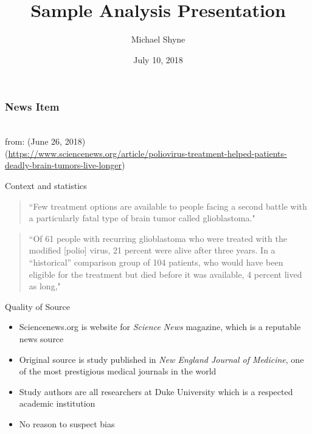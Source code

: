\documentclass[xcolor=table, aspectratio=169, bigger]{beamer}
\title[Short title]{Sample Analysis Presentation}
\author[M. Shyne]{\Large Michael Shyne}
\date{July 10, 2018}
\begin{document}
\frame{\titlepage}

\begin{frame}
\frametitle{News Item}
{\centering 
{}\\
\medskip
from:  (June 26, 2018)\\
\smallskip
(\href{https://www.sciencenews.org/article/poliovirus-treatment-helped-patients-deadly-brain-tumors-live-longer}{https://www.sciencenews.org/article/poliovirus-treatment-helped-patients-deadly-brain-tumors-live-longer})\\
\par}
\end{frame}

\begin{frame}{Context and statistics}
\begin{quote}
``Few treatment options are available to people facing a second battle with a particularly fatal type of brain tumor called glioblastoma." 
\end{quote}
\begin{quote}
``Of 61 people with recurring glioblastoma who were treated with the modified [polio] virus, 21 percent were alive after three years. In a “historical” comparison group of 104 patients, who would have been eligible for the treatment but died before it was available, 4 percent lived as long,"
\end{quote}
\end{frame}

\begin{frame}{Quality of Source}
\begin{itemize}
\item Sciencenews.org is website for \emph{Science News} magazine, which is a reputable news source
\item Original source is study published in \emph{New England Journal of Medicine}, one of the most prestigious medical journals in the world
\item Study authors are all researchers at Duke University which is a respected academic institution
\item No reason to suspect bias
\end{itemize}
\end{frame}
\end{document}
